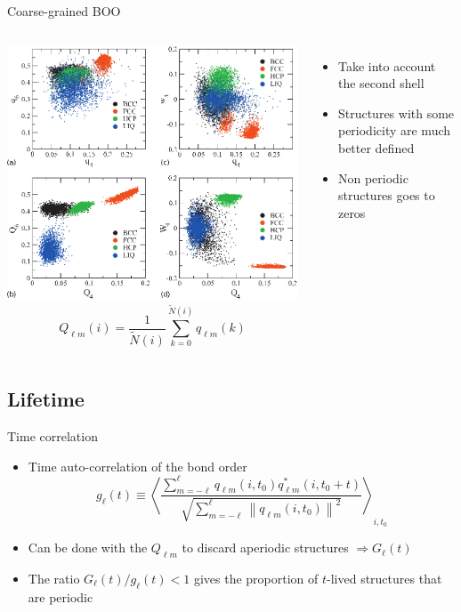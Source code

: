 \begin{frame}{Coarse-grained BOO}
	\begin{columns}
	\includegraphics[width=\columnwidth]{invariants_maps_raster}
	\[ Q_{\ell m}(i) = \frac{1}{\tilde{N} (i)} \sum_{k=0}^{\tilde{N}(i)} q_{\ell m}(k) \]
	\begin{itemize}
		\item Take into account the second shell
		\item Structures with some periodicity are much better defined
		\item Non periodic structures goes to zeros
	\end{itemize}
	\end{columns}
	\footnotesize{\citet{lechner2008}}
\end{frame}

\subsection{Lifetime}

\begin{frame}{Time correlation}
	\begin{itemize}
	\item Time auto-correlation of the bond order
	\[
	g_\ell(t) \equiv \left\langle \frac{
		\sum_{m=-\ell}^{\ell} q_{\ell m}(i, t_0) q_{\ell m}^{*}(i, t_0+t)
	}{
		\sqrt{\sum_{m=-\ell}^{\ell} \left\|q_{\ell m}(i,t_0)\right\|^2}
	}\right\rangle_{i, t_0}
	\]
	\item Can be done with the $Q_{\ell m}$ to discard aperiodic structures $\Longrightarrow G_\ell(t)$
	\item The ratio $G_\ell(t)/g_\ell(t)<1$ gives the proportion of $t$-lived structures that are periodic
	\end{itemize}
\end{frame}

